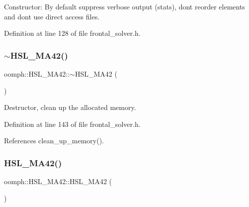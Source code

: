 Constructor\+: By default suppress verbose output (stats), don\textquotesingle{}t reorder elements and don\textquotesingle{}t use direct access files. 



Definition at line 128 of file frontal\+\_\+solver.\+h.

\mbox{\label{classoomph_1_1HSL__MA42_a0987633afd0b7856dbedadab6ff8e41b}} 
\subsubsection{\texorpdfstring{$\sim$\+H\+S\+L\+\_\+\+M\+A42()}{~HSL\_MA42()}}
{\footnotesize\ttfamily oomph\+::\+H\+S\+L\+\_\+\+M\+A42\+::$\sim$\+H\+S\+L\+\_\+\+M\+A42 (\begin{DoxyParamCaption}{ }\end{DoxyParamCaption})\hspace{0.3cm}{\ttfamily [inline]}}



Destructor, clean up the allocated memory. 



Definition at line 143 of file frontal\+\_\+solver.\+h.



References clean\+\_\+up\+\_\+memory().

\mbox{\label{classoomph_1_1HSL__MA42_a188fd0cf1d4159f3633a09e61d2029b0}} 
\subsubsection{\texorpdfstring{H\+S\+L\+\_\+\+M\+A42()}{HSL\_MA42()}\hspace{0.1cm}{\footnotesize\ttfamily [2/2]}}
{\footnotesize\ttfamily oomph\+::\+H\+S\+L\+\_\+\+M\+A42\+::\+H\+S\+L\+\_\+\+M\+A42 (\begin{DoxyParamCaption}\item[{const \hyperlink{classoomph_1_1HSL__MA42}{H\+S\+L\+\_\+\+M\+A42} \&}]{ }\end{DoxyParamCaption})\hspace{0.3cm}{\ttfamily [inline]}}



